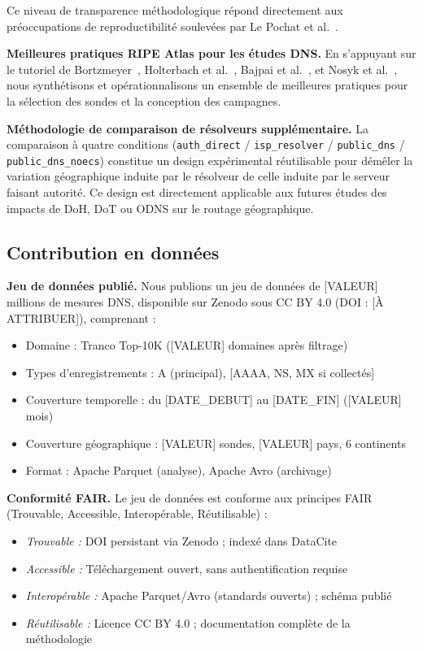 Ce niveau de transparence méthodologique répond directement aux préoccupations de reproductibilité soulevées par Le Pochat et al.~\cite{LePochat2019}.

\textbf{Meilleures pratiques RIPE Atlas pour les études DNS.}
En s'appuyant sur le tutoriel de Bortzmeyer~\cite{Bortzmeyer_tutorial}, Holterbach et al.~\cite{Holterbach2015}, Bajpai et al.~\cite{Bajpai2017}, et Nosyk et al.~\cite{Nosyk2024}, nous synthétisons et opérationnalisons un ensemble de meilleures pratiques pour la sélection des sondes et la conception des campagnes.

\textbf{Méthodologie de comparaison de résolveurs supplémentaire.}
La comparaison à quatre conditions (\texttt{auth\_direct} / \texttt{isp\_resolver} / \texttt{public\_dns} / \texttt{public\_dns\_noecs}) constitue un design expérimental réutilisable pour démêler la variation géographique induite par le résolveur de celle induite par le serveur faisant autorité. Ce design est directement applicable aux futures études des impacts de DoH, DoT ou ODNS sur le routage géographique.
\bigskip
\subsection{Contribution en données}
\label{subsec:5.3.3}

\textbf{Jeu de données publié.}
Nous publions un jeu de données de [VALEUR] millions de mesures DNS, disponible sur Zenodo sous CC BY 4.0 (DOI : [À ATTRIBUER]), comprenant :
\begin{itemize}
  \item Domaine : Tranco Top-10K ([VALEUR] domaines après filtrage)
  \item Types d'enregistrements : A (principal), [AAAA, NS, MX si collectés]
  \item Couverture temporelle : du [DATE\_DEBUT] au [DATE\_FIN] ([VALEUR] mois)
  \item Couverture géographique : [VALEUR] sondes, [VALEUR] pays, 6 continents
  \item Format : Apache Parquet (analyse), Apache Avro (archivage)
\end{itemize}

\textbf{Conformité FAIR.}
Le jeu de données est conforme aux principes FAIR (Trouvable, Accessible, Interopérable, Réutilisable) :
\begin{itemize}
  \item \textit{Trouvable :} DOI persistant via Zenodo ; indexé dans DataCite
  \item \textit{Accessible :} Téléchargement ouvert, sans authentification requise
  \item \textit{Interopérable :} Apache Parquet/Avro (standards ouverts) ; schéma publié
  \item \textit{Réutilisable :} Licence CC BY 4.0 ; documentation complète de la méthodologie
\end{itemize}
\bigskip
